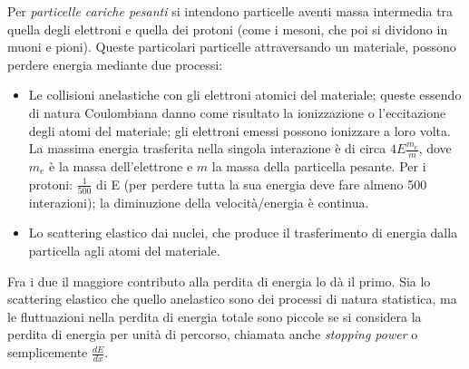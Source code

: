 \documentclass[12pt, letterpaper]{book}
\begin{document}
Per \textit{particelle cariche pesanti} si intendono particelle aventi massa intermedia tra quella degli elettroni e quella dei protoni (come i mesoni, che poi si dividono in muoni e pioni). Queste particolari particelle attraversando un materiale, possono perdere energia mediante due processi:
\begin{itemize}
    \item  Le collisioni anelastiche con gli elettroni atomici del materiale; queste essendo di natura Coulombiana danno come risultato la ionizzazione o l'eccitazione degli atomi del materiale; gli elettroni emessi possono ionizzare a loro volta. La massima energia trasferita nella singola interazione è di circa $4E \frac{m_e}{m}$, dove $m_e$ è la massa dell'elettrone e $m$ la massa della particella pesante. Per i protoni: $\frac{1}{500}$ di E (per perdere tutta la sua energia deve fare almeno 500 interazioni); la diminuzione della velocità/energia è continua.
    \item Lo scattering elastico dai nuclei, che produce il trasferimento di energia dalla particella agli atomi del materiale.
\end{itemize}
Fra i due il maggiore contributo alla perdita di energia lo dà il primo. Sia lo scattering elastico che quello anelastico sono dei processi di natura statistica, ma le fluttuazioni nella perdita di energia totale sono piccole se si considera la perdita di energia per unità di percorso, chiamata anche \textit{stopping power} o semplicemente $\frac{dE}{dx}$.\\
\end{document}
